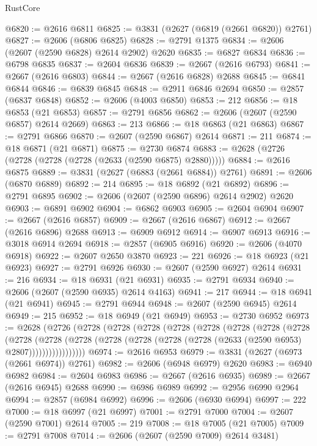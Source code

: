 \begin{lexlean}{RustCore}
\begin{coremodule}
@6820 := @2616 @6811
@6825 := @3831 (@2627 (@6819 (@2661 @6820)) @2761)
@6827 := @2606 (@6806 @6825)
@6828 := @2791 @1375
@6834 := @2606 (@2607 (@2590 @6828) @2614 @2902) @2620
@6835 := @6827 @6834
@6836 := @6798 @6835
@6837 := @2604 @6836
@6839 := @2667 (@2616 @6793)
@6841 := @2667 (@2616 @6803)
@6844 := @2667 (@2616 @6828) @2688
@6845 := @6841 @6844
@6846 := @6839 @6845
@6848 := @2911 @6846 @2694
@6850 := @2857 (@6837 @6848)
@6852 := @2606 (@4003 @6850)
@6853 := 212
@6856 := @18 @6853 (@21 @6853)
@6857 := @2791 @6856
@6862 := @2606 (@2607 (@2590 @6857) @2614 @2669)
@6863 := 213
@6866 := @18 @6863 (@21 @6863)
@6867 := @2791 @6866
@6870 := @2607 (@2590 @6867) @2614
@6871 := 211
@6874 := @18 @6871 (@21 @6871)
@6875 := @2730 @6874
@6883 := @2628 (@2726 (@2728 (@2728 (@2728 (@2633 (@2590 @6875) @2880)))))
@6884 := @2616 @6875
@6889 := @3831 (@2627 (@6883 (@2661 @6884)) @2761)
@6891 := @2606 (@6870 @6889)
@6892 := 214
@6895 := @18 @6892 (@21 @6892)
@6896 := @2791 @6895
@6902 := @2606 (@2607 (@2590 @6896) @2614 @2902) @2620
@6903 := @6891 @6902
@6904 := @6862 @6903
@6905 := @2604 @6904
@6907 := @2667 (@2616 @6857)
@6909 := @2667 (@2616 @6867)
@6912 := @2667 (@2616 @6896) @2688
@6913 := @6909 @6912
@6914 := @6907 @6913
@6916 := @3018 @6914 @2694
@6918 := @2857 (@6905 @6916)
@6920 := @2606 (@4070 @6918)
@6922 := @2607 @2650 @3870
@6923 := 221
@6926 := @18 @6923 (@21 @6923)
@6927 := @2791 @6926
@6930 := @2607 (@2590 @6927) @2614
@6931 := 216
@6934 := @18 @6931 (@21 @6931)
@6935 := @2791 @6934
@6940 := @2606 (@2607 (@2590 @6935) @2614 @4163)
@6941 := 217
@6944 := @18 @6941 (@21 @6941)
@6945 := @2791 @6944
@6948 := @2607 (@2590 @6945) @2614
@6949 := 215
@6952 := @18 @6949 (@21 @6949)
@6953 := @2730 @6952
@6973 := @2628
    (@2726
      (@2728
        (@2728
          (@2728
            (@2728
              (@2728
                (@2728
                  (@2728
                    (@2728
                      (@2728
                        (@2728
                          (@2728
                            (@2728 (@2728 (@2728 (@2728 (@2633 (@2590 @6953) @2807)))))))))))))))))
@6974 := @2616 @6953
@6979 := @3831 (@2627 (@6973 (@2661 @6974)) @2761)
@6982 := @2606 (@6948 @6979) @2620
@6983 := @6940 @6982
@6984 := @2604 @6983
@6986 := @2667 (@2616 @6935)
@6989 := @2667 (@2616 @6945) @2688
@6990 := @6986 @6989
@6992 := @2956 @6990 @2964
@6994 := @2857 (@6984 @6992)
@6996 := @2606 (@6930 @6994)
@6997 := 222
@7000 := @18 @6997 (@21 @6997)
@7001 := @2791 @7000
@7004 := @2607 (@2590 @7001) @2614
@7005 := 219
@7008 := @18 @7005 (@21 @7005)
@7009 := @2791 @7008
@7014 := @2606 (@2607 (@2590 @7009) @2614 @3481)

\end{coremodule}
\end{lexlean}
